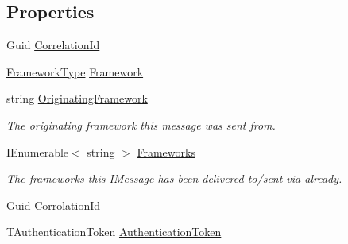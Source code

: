 \subsection*{Properties}
\begin{DoxyCompactItemize}
\item 
Guid \hyperlink{classCqrs_1_1Events_1_1DuplicateCreateCommandEvent_a7a47624fa44952499c87458257184079_a7a47624fa44952499c87458257184079}{Correlation\+Id}
\item 
\hyperlink{namespaceCqrs_1_1Messages_af06a7e6cd2609043d0f2f5f3419f81e3_af06a7e6cd2609043d0f2f5f3419f81e3}{Framework\+Type} \hyperlink{classCqrs_1_1Events_1_1DuplicateCreateCommandEvent_af22f0d27a301ca163314550b8991d922_af22f0d27a301ca163314550b8991d922}{Framework}
\item 
string \hyperlink{classCqrs_1_1Events_1_1DuplicateCreateCommandEvent_a9f3b0ffe268a9be9895009b3f8894727_a9f3b0ffe268a9be9895009b3f8894727}{Originating\+Framework}
\begin{DoxyCompactList}\small\item\em The originating framework this message was sent from. \end{DoxyCompactList}\item 
I\+Enumerable$<$ string $>$ \hyperlink{classCqrs_1_1Events_1_1DuplicateCreateCommandEvent_a9cef5da3d0b1481cd3ec9fd448d501af_a9cef5da3d0b1481cd3ec9fd448d501af}{Frameworks}
\begin{DoxyCompactList}\small\item\em The frameworks this I\+Message has been delivered to/sent via already. \end{DoxyCompactList}\item 
Guid \hyperlink{classCqrs_1_1Events_1_1DuplicateCreateCommandEvent_a09f55bcafebdc68ef2440031d558da0a_a09f55bcafebdc68ef2440031d558da0a}{Corrolation\+Id}
\item 
T\+Authentication\+Token \hyperlink{classCqrs_1_1Events_1_1DuplicateCreateCommandEvent_ab9737d0d029bb3f4b37d2a628ea98d04_ab9737d0d029bb3f4b37d2a628ea98d04}{Authentication\+Token}

\end{DoxyCompactItemize}
